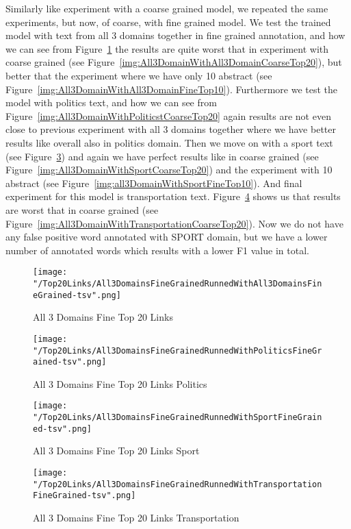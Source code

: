 \documentclass[thesis=M,english]{FITthesis}[2018/05/30]
\begin{document}
	Similarly like experiment with a coarse grained model, we repeated the same experiments, but now, of coarse, with fine grained model.
	We test the trained model with text from all 3 domains together in fine grained annotation, and how we can see from Figure~\ref{img:All3DomainWithAll3DomainFineTop20} the results are quite worst that in experiment with coarse grained (see Figure~\ref{img:All3DomainWithAll3DomainCoarseTop20}), but better that the experiment where we have only 10 abstract (see Figure~\ref{img:All3DomainWithAll3DomainFineTop10}).
	Furthermore we test the model with politics text, and how we can see from Figure~\ref{img:All3DomainWithPoliticstCoarseTop20} again results are not even close to previous experiment with all 3 domains together where we have better results like overall also in politics domain.
	Then we move on with a sport text (see Figure~\ref{img:All3DomainWithSportFineTop20}) and again we have perfect results like in coarse grained (see Figure~\ref{img:All3DomainWithSportCoarseTop20}) and the experiment with 10 abstract (see Figure~\ref{img:all3DomainWithSportFineTop10}).
	And final experiment for this model is transportation text. Figure~\ref{img:All3DomainWithTransportationFineTop20} shows us that results are worst that in coarse grained (see Figure~\ref{img:All3DomainWithTransportationCoarseTop20}). Now we do not have any false positive word annotated with SPORT domain, but we have a lower number of annotated words which results with a lower F1 value in total.	 
	\begin{figure}[H]\centering
		\texttt{[image: "/Top20Links/All3DomainsFineGrainedRunnedWithAll3DomainsFineGrained-tsv".png]}
		\caption{All 3 Domains Fine Top 20 Links }\label{img:All3DomainWithAll3DomainFineTop20}	
	\end{figure}
	\begin{figure}[H]\centering
		\texttt{[image: "/Top20Links/All3DomainsFineGrainedRunnedWithPoliticsFineGrained-tsv".png]}
		\caption{All 3 Domains Fine Top 20 Links Politics}\label{img:All3DomainWithPoliticsFineTop20}
	\end{figure}	
	\begin{figure}[H]\centering
		\texttt{[image: "/Top20Links/All3DomainsFineGrainedRunnedWithSportFineGrained-tsv".png]}
		\caption{All 3 Domains Fine Top 20 Links Sport}\label{img:All3DomainWithSportFineTop20}
	\end{figure}
	\begin{figure}[H]\centering
		\texttt{[image: "/Top20Links/All3DomainsFineGrainedRunnedWithTransportationFineGrained-tsv".png]}
		\caption{All 3 Domains Fine Top 20 Links Transportation}\label{img:All3DomainWithTransportationFineTop20}	
	\end{figure}
\end{document}
